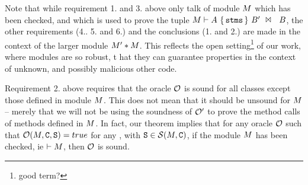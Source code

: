  Note that  while  requirement 1. and 3. above only talk of module $M$ which has been checked, and
which is used to prove the tuple ${{M}\vdash {\ensuremath {A}}\ \{\, {{\textrm{\ttfamily{stms}}}}\, \}\ {B'}\ \Join\ \ {B} }$,  the other
requirements  (4.. 5. and 6.) and the conclusions (1. and 2.) are made in the context of the
larger module $M'*M$. This reflects the
open setting\footnote{good term?}  of our work, where modules are so robust, t
hat they can guarantee properties in
the context of unknown, and possibly malicious other code.

Requirement 2. above requires that the oracle ${\cal O}$ is sound for all classes except those defined in module $M$. This does not mean that it should be unsound for $M$ -- merely that we will not be using the soundness of ${\cal O}'$ to prove the method calls of methods defined in $M$. In fact, our theorem implies that  for any oracle ${\cal O}$ such that
${\cal O}(M,{\textrm{\ttfamily{C}}},{\textrm{\ttfamily{S}}})=true$ for any , with ${\textrm{\ttfamily{S}}}\in{\cal S}(M,{\textrm{\ttfamily{C}}})$, if the module $M$ has been checked, ie $\vdash M$, then ${\cal O}$ is sound.



